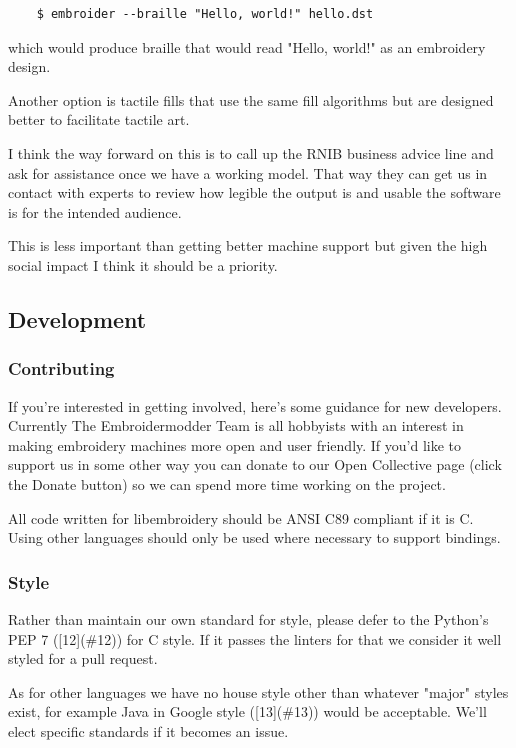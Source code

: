 \documentclass[a4paper, 11pt]{report}
\begin{document}
\begin{verbatim}
    $ embroider --braille "Hello, world!" hello.dst
\end{verbatim}

which would produce braille that would read "Hello, world!" as an embroidery
design.

Another option is tactile fills that use the same fill algorithms but are
designed better to facilitate tactile art.

I think the way forward on this is to call up the RNIB business advice line and
ask for assistance once we have a working model. That way they can get us in
contact with experts to review how legible the output is and usable the
software is for the intended audience.

This is less important than getting better machine support but given the high
social impact I think it should be a priority.

\subsection{Development}

\subsubsection{Contributing}

If you're interested in getting involved, here's some guidance
for new developers. Currently The Embroidermodder Team is all
hobbyists with an interest in making embroidery machines more
open and user friendly. If you'd like to support us in some other way
you can donate to our Open Collective page (click the Donate button) so
we can spend more time working on the project.

All code written for libembroidery should be ANSI C89 compliant
if it is C. Using other languages should only be used where
necessary to support bindings.

\subsubsection{ Style}

Rather than maintain our own standard for style, please defer to
the Python's PEP 7 ([12](\#12)) for C style.
If it passes the linters for that we consider it well styled
for a pull request.

As for other languages we have no house style other than whatever
"major" styles exist, for example Java in
Google style ([13](\#13))
would be acceptable. We'll elect specific standards if it becomes
an issue.
\end{document}
